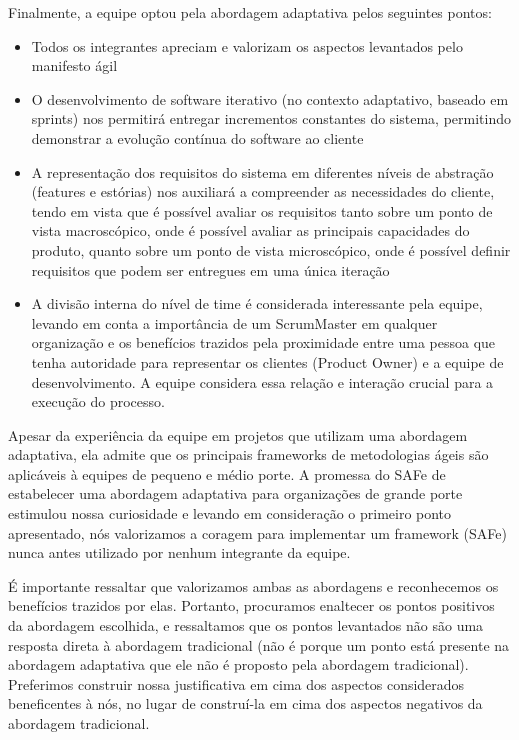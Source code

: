 Finalmente, a equipe optou pela abordagem adaptativa pelos seguintes pontos:
\begin{itemize}
\item Todos os integrantes apreciam e valorizam os aspectos levantados pelo manifesto ágil

\item O desenvolvimento de software iterativo (no contexto adaptativo, baseado em sprints) nos permitirá entregar incrementos constantes do sistema, permitindo demonstrar a evolução contínua do software ao cliente

\item A representação dos requisitos do sistema em diferentes níveis de abstração (features e estórias) nos auxiliará a compreender as necessidades do cliente, tendo em vista que é possível avaliar os requisitos tanto sobre um ponto de vista macroscópico, onde é possível avaliar as principais capacidades do produto, quanto sobre um ponto de vista microscópico, onde é possível definir requisitos que podem ser entregues em uma única iteração

\item A divisão interna do nível de time é considerada interessante pela equipe, levando em conta a importância de um ScrumMaster em qualquer organização e os benefícios trazidos pela proximidade entre uma pessoa que tenha autoridade para representar os clientes (Product Owner) e a equipe de desenvolvimento. A equipe considera essa relação e interação crucial para a execução do processo.
\end{itemize}

Apesar da experiência da equipe em projetos que utilizam uma abordagem adaptativa, ela admite que os principais frameworks de metodologias ágeis são aplicáveis à equipes de pequeno e médio porte. A promessa do SAFe de estabelecer uma abordagem adaptativa para organizações de grande porte estimulou nossa curiosidade e levando em consideração o primeiro ponto apresentado, nós valorizamos a coragem para implementar um framework (SAFe) nunca antes utilizado por nenhum integrante da equipe.

É importante ressaltar que valorizamos ambas as abordagens e reconhecemos os benefícios trazidos por elas. Portanto, procuramos enaltecer os pontos positivos da abordagem escolhida, e ressaltamos que os pontos levantados não são uma resposta direta à abordagem tradicional (não é porque um ponto está presente na abordagem adaptativa que ele não é proposto pela abordagem tradicional). Preferimos construir nossa justificativa em cima dos aspectos considerados beneficentes à nós, no lugar de construí-la em cima dos aspectos negativos da abordagem tradicional.


